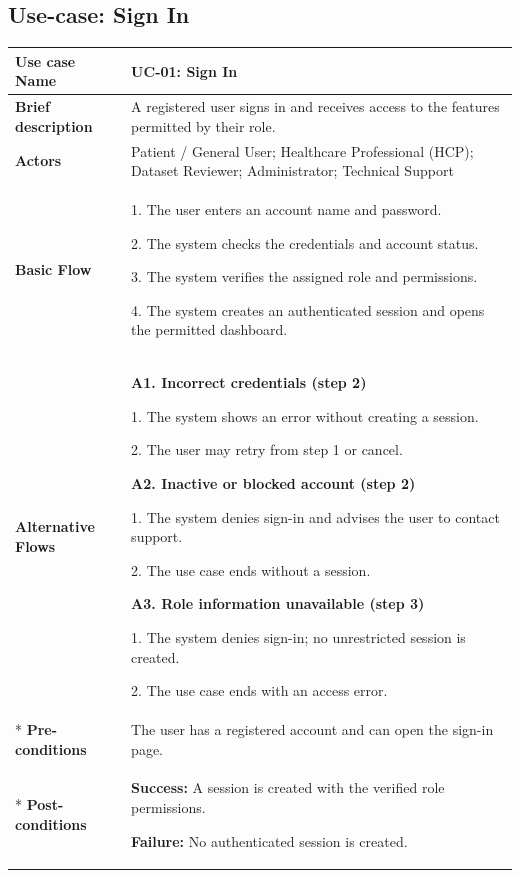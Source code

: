 
\clearpage
\subsection{Use-case: Sign In}
\label{uc:uc-01}

\begin{longtable}{|p{}|p{}|}
\hline
\textbf{Use case Name} & UC-01: Sign In \\ \hline
\textbf{Brief description} & A registered user signs in and receives access to the features permitted by their role. \\ \hline
\textbf{Actors} & Patient / General User; Healthcare Professional (HCP); Dataset Reviewer; Administrator; Technical Support \\ \hline
\textbf{Basic Flow} &
1. The user enters an account name and password.\par
2. The system checks the credentials and account status.\par
3. The system verifies the assigned role and permissions.\par
4. The system creates an authenticated session and opens the permitted dashboard.
\\ \hline
\textbf{Alternative Flows} &
\textbf{A1. Incorrect credentials (step 2)}\par
1. The system shows an error without creating a session.\par
2. The user may retry from step 1 or cancel.
\par
\textbf{A2. Inactive or blocked account (step 2)}\par
1. The system denies sign-in and advises the user to contact support.\par
2. The use case ends without a session.
\par
\textbf{A3. Role information unavailable (step 3)}\par
1. The system denies sign-in; no unrestricted session is created.\par
2. The use case ends with an access error.
\\* \hline
\textbf{Pre-conditions} & The user has a registered account and can open the sign-in page. \\* \hline
\textbf{Post-conditions} & \textbf{Success:} A session is created with the verified role permissions.\par
\textbf{Failure:} No authenticated session is created. \\ \hline
\end{longtable}

